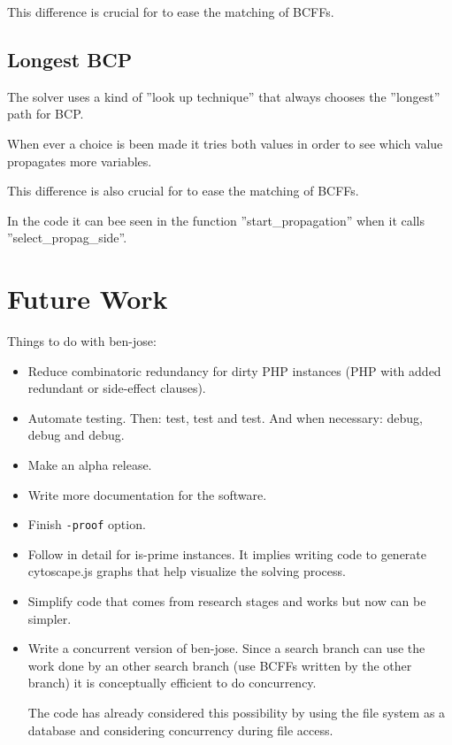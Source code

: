 \documentclass{easychair}
\begin{document}
This difference is crucial for to ease the matching of BCFFs.

\subsection{Longest BCP}

The solver uses a kind of ''look up technique'' that always chooses the ''longest'' path for BCP. 

When ever a choice is been made it tries both values in order to see which value propagates more variables. 

This difference is also crucial for to ease the matching of BCFFs.

In the code it can bee seen in the function ''start\_propagation'' when it calls ''select\_propag\_side''.

\section{Future Work}
\label{sect:future-work}

Things to do with ben-jose:

\begin{itemize}
\item
Reduce combinatoric redundancy for dirty PHP instances (PHP with added redundant or side-effect clauses).

\item
Automate testing. Then: test, test and test. And when necessary: debug, debug and debug.

\item
Make an alpha release.

\item
Write more documentation for the software.

\item
Finish \texttt{-proof} option.

\item
Follow in detail for is-prime instances. It implies writing code to generate cytoscape.js graphs that help visualize the solving process.

\item
Simplify code that comes from research stages and works but now can be simpler.

\item
Write a concurrent version of ben-jose. Since a search branch can use the work done by an other search branch (use BCFFs written by the other branch) it is conceptually efficient to do concurrency.

The code has already considered this possibility by using the file system as a database and considering concurrency during file access.

\end{itemize}
\end{document}
